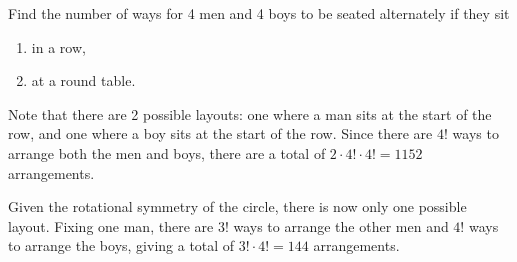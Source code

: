 \begin{solution}
\begin{ppart}
        \begin{center}
        \end{center}
    \end{ppart}
\end{solution}

\begin{problem}
    Find the number of ways for 4 men and 4 boys to be seated alternately if they sit
    \begin{enumerate}
        \item in a row,
        \item at a round table.
    \end{enumerate}
\end{problem}
\begin{solution}
    \begin{ppart}
        Note that there are 2 possible layouts: one where a man sits at the start of the row, and one where a boy sits at the start of the row. Since there are $4!$ ways to arrange both the men and boys, there are a total of $2 \cdot 4! \cdot 4! = 1152$ arrangements.
    \end{ppart}
    \begin{ppart}
        Given the rotational symmetry of the circle, there is now only one possible layout. Fixing one man, there are $3!$ ways to arrange the other men and $4!$ ways to arrange the boys, giving a total of $3! \cdot 4! = 144$ arrangements.
    \end{ppart}
\end{solution}

